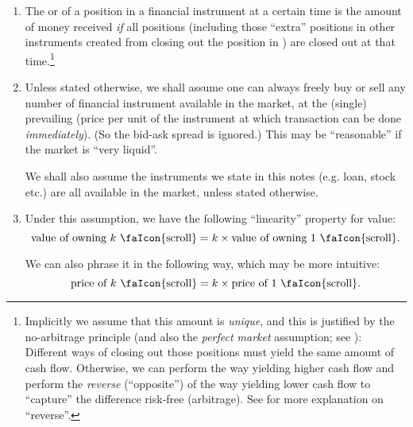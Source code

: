 \begin{enumerate}
\item The  or  of a position in a financial instrument
 at a certain time is the amount of money 
received \emph{if} all positions (including those ``extra'' positions in other
instruments created from closing out the position in ) are
closed out at that time.\footnote{Implicitly we assume that this amount is
\emph{unique}, and this is justified by the no-arbitrage principle (and also
the \emph{perfect market} assumption; see ):
Different ways of closing out those positions must yield the same amount of
cash flow.  Otherwise, we can perform the way yielding higher cash flow and
perform the \emph{reverse} (``opposite'') of the way yielding lower cash flow
to ``capture'' the difference risk-free (arbitrage). See 
for more explanation on ``reverse''.}

\item \label{it:buy-sell-any-num}
Unless stated otherwise, we shall assume one can always freely buy or sell any
number of financial instrument available in the market, at the (single)
prevailing  (price per unit of the instrument at which
transaction can be done \emph{immediately}). (So the bid-ask spread is
ignored.) This may be ``reasonable'' if the market is ``very liquid''.

\begin{note}
We shall also assume the instruments we state in this notes (e.g. loan, stock
etc.) are all available in the market, unless stated otherwise.
\end{note}

\item \label{it:value-linear}
Under this assumption, we have the following ``linearity'' property for
value:
\[
\text{value of owning \(k\) \faIcon{scroll}} = k\times\text{value of owning 1 \faIcon{scroll}}.
\]
\begin{note}
We can also phrase it in the following way, which may be more intuitive:
\[
\text{price of \(k\) \faIcon{scroll}} = k\times\text{price of 1 \faIcon{scroll}}.
\]
\end{note}


\end{enumerate}
